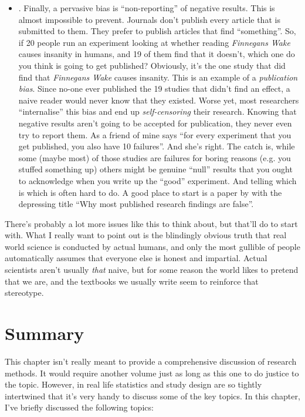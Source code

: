 \begin{itemize}
\item {}. Finally, a pervasive bias is ``non-reporting'' of negative results. This is almost impossible to prevent. Journals don't publish every article that is submitted to them. They prefer to publish articles that find ``something''. So, if 20 people run an experiment looking at whether reading {\it Finnegans Wake} causes insanity in humans, and 19 of them find that it doesn't, which one do you think is going to get published? Obviously, it's the one study that did find that {\it Finnegans Wake} causes insanity. This is an example of a {\it publication bias}. Since no-one ever published the 19 studies that didn't find an effect, a naive reader would never know that they existed. Worse yet, most researchers ``internalise'' this bias and end up {\it self-censoring} their research. Knowing that negative results aren't going to be accepted for publication, they never even try to report them. As a friend of mine says ``for every experiment that you get published, you also have 10 failures''. And she's right. The catch is, while some (maybe most) of those studies are failures for boring reasons (e.g. you stuffed something up) others might be genuine ``null'' results that you ought to acknowledge when you write up the ``good'' experiment. And telling which is which is often hard to do. A good place to start is a paper by \textcite{Ioannidis2005} with the depressing title ``Why most published research findings are false''. 
\end{itemize}

There's probably a lot more issues like this to think about, but that'll do to start with. What I really want to point out is the blindingly obvious truth that real world science is conducted by actual humans, and only the most gullible of people automatically assumes that everyone else is honest and impartial. Actual scientists aren't usually {\it that} naive, but for some reason the world likes to pretend that we are, and the textbooks we usually write seem to reinforce that stereotype.

\section{Summary}

This chapter isn't really meant to provide a comprehensive discussion of research methods. It would require another volume just as long as this one to do justice to the topic. However, in real life statistics and study design are so tightly intertwined that it's very handy to discuss some of the key topics. In this chapter, I've briefly discussed the following topics:

